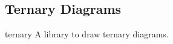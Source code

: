 \subsection{Ternary Diagrams}

\begin{pgfplotslibrary}{ternary}
	A library to draw ternary diagrams.
\end{pgfplotslibrary}
